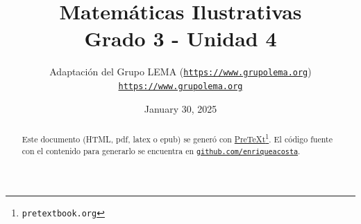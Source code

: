 \documentclass[twoside,10pt,]{article}
\title{Matemáticas Ilustrativas\\
{\large Grado 3 - Unidad 4}}
\author{Adaptación del Grupo LEMA (\href{https://www.grupolema.org}{\nolinkurl{https://www.grupolema.org}})\\
\href{https://www.grupolema.org}{\nolinkurl{https://www.grupolema.org}}
}
\date{January 30, 2025}
\begin{document}
\raggedbottom
\label{gra3-uni4}\hypertarget{gra3-uni4}{}
\maketitle
\thispagestyle{empty}
\renewcommand*{\abstractname}{Resumen}
\begin{abstract}
\end{abstract}
\renewcommand*{\abstractname}{Resumen}
\begin{abstract}
Este documento (HTML, pdf, latex o epub) se generó con \href{https://pretextbook.org}{PreTeXt}\footnote{\nolinkurl{pretextbook.org}\label{meta-source-2-2}}. El código fuente con el contenido para generarlo se encuentra en \href{https://github.com/enriqueacosta/IllustrativeMath-GrupoLEMA}{\nolinkurl{github.com/enriqueacosta}}.%
\end{abstract}
\renewcommand*{\abstractname}{Resumen}
\end{document}

